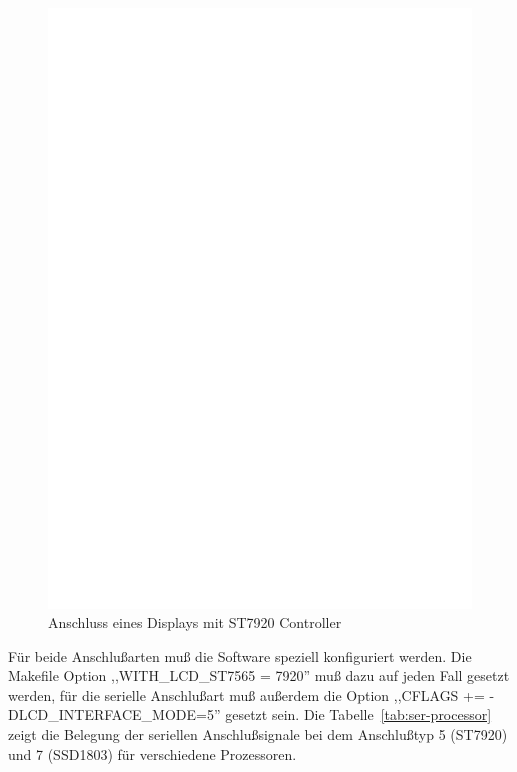 \begin{figure}[H]
\centering
\includegraphics[width=14cm]{../FIG/ST7920interface.eps}
\caption{Anschluss eines Displays mit ST7920 Controller}
\label{fig:ST7920lcd}
\end{figure}

Für beide Anschlußarten muß die Software speziell konfiguriert werden. 
Die Makefile Option ,,WITH\_LCD\_ST7565 = 7920'' muß dazu auf jeden Fall gesetzt werden, für die serielle
Anschlußart muß außerdem die Option ,,CFLAGS += -DLCD\_INTERFACE\_MODE=5'' gesetzt sein.
Die Tabelle~\ref{tab:ser-processor} zeigt die Belegung der seriellen Anschlußsignale bei 
dem Anschlußtyp 5 (ST7920) und 7 (SSD1803) für verschiedene Prozessoren.


